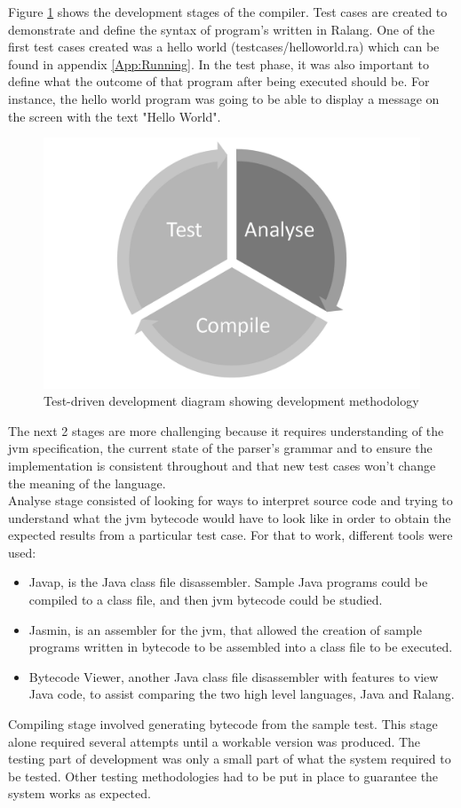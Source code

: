 \documentclass[a4paper]{article}
\begin{document}
	Figure \ref{fig:test_driven_development} shows the development stages of the compiler. Test cases are created to demonstrate and define the syntax of program's written in Ralang. One of the first test cases created was a hello world (testcases/helloworld.ra) which can be found in appendix \ref{App:Running}. In the test phase, it was also important to define what the outcome of that program after being executed should be. For instance, the hello world program was going to be able to display a message on the screen with the text "Hello World".\\
	
	\begin{figure}[h!]
		\centering
		\includegraphics[width=0.7\linewidth]{images/test_driven_development.png}
		\caption{Test-driven development diagram showing development methodology}
		\label{fig:test_driven_development}
	\end{figure}
	The next 2 stages are more challenging because it requires understanding of the \ac{jvm} specification, the current state of the parser's grammar and to ensure the implementation is consistent throughout and that new test cases won't change the meaning of the language.\\
	
	Analyse stage consisted of looking for ways to interpret source code and trying to understand what the \ac{jvm} bytecode would have to look like in order to obtain the expected results from a particular test case. For that to work, different tools were used:
	\begin{itemize}
		\item Javap, is the Java class file disassembler. Sample Java programs could be compiled to a class file, and then \ac{jvm} bytecode could be studied.
		\item Jasmin, is an assembler for the \ac{jvm}, that allowed the creation of sample programs written in bytecode to be assembled into a class file to be executed.
		\item Bytecode Viewer, another Java class file disassembler with features to view Java code, to assist comparing the two high level languages, Java and Ralang.
	\end{itemize}
	Compiling stage involved generating bytecode from the sample test. This stage alone required several attempts until a workable version was produced. The testing part of development was only a small part of what the system required to be tested. Other testing methodologies had to be put in place to guarantee the system works as expected.\\
	
\end{document}

